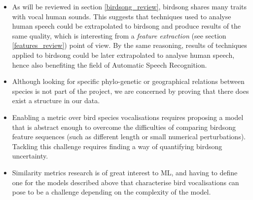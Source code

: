 \documentclass[../main.tex]{subfiles}
\begin{document}
\begin{itemize}
\item As will be reviewed in section \ref{birdsong_review}, birdsong shares many traits with vocal human sounds. This suggests that techniques used to analyse human speech could be extrapolated to birdsong and produce results of the same quality, which is interesting from a \emph{feature extraction} (see section \ref{features_review}) point of view. By the same reasoning, results of techniques applied to birdsong could be later extrapolated to analyse human speech, hence also benefiting the field of Automatic Speech Recognition.
\item Although looking for specific phylo-genetic or geographical relations between species is not part of the project, we are concerned by proving that there does exist a structure in our data.
\item Enabling a metric over bird species vocalisations requires proposing a model that is abstract enough to overcome the difficulties of comparing birdsong feature sequences (such as different length or small numerical perturbations). Tackling this challenge requires finding a way of quantifying birdsong uncertainty.
\item Similarity metrics research is of great interest to ML, and having to define one for the models described above that characterise bird vocalisations can pose to be a challenge depending on the complexity of the model.
\end{itemize}
\end{document}
